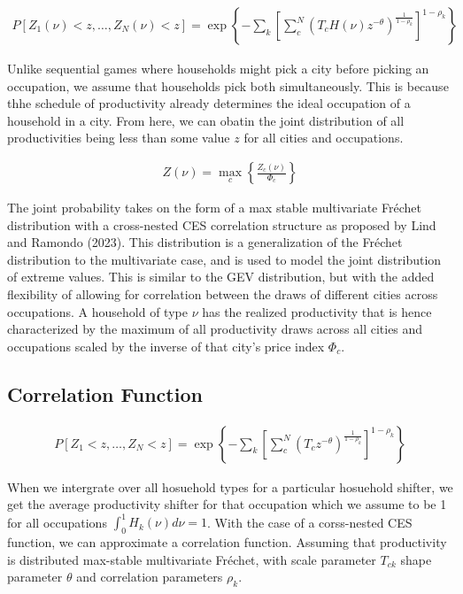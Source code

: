 \documentclass[10pt]{article}
\begin{document}
\begin{align}
    P[Z_1(\nu) < z, \dots, Z_N(\nu) < z] = \exp \left\{ - \sum_{k}^{} \left[ \sum_{c}^{N} (T_c H(\nu) z^{- \theta})^{\frac{1}{1 - \rho_k}} \right]^{1 - \rho_k} \right\}
\end{align}

Unlike sequential games where households might pick a city before picking an occupation, we assume that households pick both simultaneously. This is because thhe schedule of productivity already determines the ideal occupation of a household in a city. From here, we can obatin the joint distribution of all productivities being less than some value $z$ for all cities and occupations.

\begin{align}
    Z(\nu) = \max_c \left\{ \frac{Z_c (\nu)}{\Phi_c} \right\}
\end{align}

The joint probability takes on the form of a max stable multivariate Fr\'{e}chet distribution with a cross-nested CES correlation structure as proposed by Lind and Ramondo (2023). This distribution is a generalization of the Fr\'{e}chet distribution to the multivariate case, and is used to model the joint distribution of extreme values. This is similar to the GEV distribution, but with the added flexibility of allowing for correlation between the draws of different cities across occupations. A household of type $\nu$ has the realized productivity that is hence characterized by the maximum of all productivity draws across all cities and occupations scaled by the inverse of that city's price index $\Phi_c$.

\subsection{Correlation Function}

\begin{align}
    P[Z_1 < z, \dots, Z_N < z] = \exp \left\{ - \sum_{k}^{} \left[ \sum_{c}^{N} (T_c z^{- \theta})^{\frac{1}{1 - \rho_k}} \right]^{1 - \rho_k} \right\}
\end{align}

When we intergrate over all hosuehold types for a particular hosuehold shifter, we get the average productivity shifter for that occupation which we assume to be 1 for all occupations $\int_{0}^{1} H_k (\nu) d\nu = 1$. With the case of a corss-nested CES function, we can approximate a correlation function. Assuming that productivity is distributed max-stable multivariate Fr\'{e}chet, with scale parameter $T_{ck}$ shape parameter $\theta$ and correlation parameters $\rho_k$.
\end{document}
